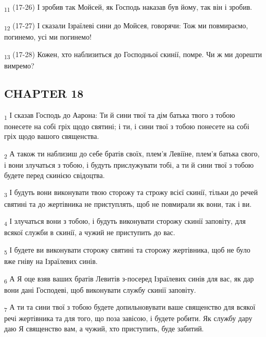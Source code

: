 \begin{tcolorbox}
\textsubscript{11} (17-26) І зробив так Мойсей, як Господь наказав був йому, так він і зробив.
\end{tcolorbox}
\begin{tcolorbox}
\textsubscript{12} (17-27) І сказали Ізраїлеві сини до Мойсея, говорячи: Тож ми повмираємо, погинемо, усі ми погинемо!
\end{tcolorbox}
\begin{tcolorbox}
\textsubscript{13} (17-28) Кожен, хто наблизиться до Господньої скинії, помре. Чи ж ми дорешти вимремо?
\end{tcolorbox}
\subsection{CHAPTER 18}
\begin{tcolorbox}
\textsubscript{1} І сказав Господь до Аарона: Ти й сини твої та дім батька твого з тобою понесете на собі гріх щодо святині; і ти, і сини твої з тобою понесете на собі гріх щодо вашого священства.
\end{tcolorbox}
\begin{tcolorbox}
\textsubscript{2} А також ти наблизиш до себе братів своїх, плем'я Левіїне, плем'я батька свого, і вони злучаться з тобою, і будуть прислужувати тобі, а ти й сини твої з тобою будете перед скинією свідоцтва.
\end{tcolorbox}
\begin{tcolorbox}
\textsubscript{3} І будуть вони виконувати твою сторожу та строжу всієї скинії, тільки до речей святині та до жертівника не приступлять, щоб не повмирали як вони, так і ви.
\end{tcolorbox}
\begin{tcolorbox}
\textsubscript{4} І злучаться вони з тобою, і будуть виконувати сторожу скинії заповіту, для всякої служби в скинії, а чужий не приступить до вас.
\end{tcolorbox}
\begin{tcolorbox}
\textsubscript{5} І будете ви виконувати сторожу святині та сторожу жертівника, щоб не було вже гніву на Ізраїлевих синів.
\end{tcolorbox}
\begin{tcolorbox}
\textsubscript{6} А Я оце взяв ваших братів Левитів з-посеред Ізраїлевих синів для вас, як дар вони дані Господеві, щоб виконувати службу скинії заповіту.
\end{tcolorbox}
\begin{tcolorbox}
\textsubscript{7} А ти та сини твої з тобою будете допильновувати ваше священство для всякої речі жертівника та для того, що поза завісою, і будете робити. Як службу дару даю Я священство вам, а чужий, хто приступить, буде забитий.
\end{tcolorbox}
